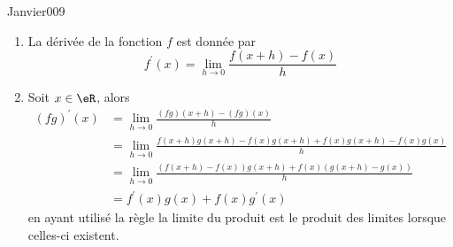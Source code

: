 \begin{corrige}{Janvier009}


\begin{enumerate}
\item
La dérivée de la fonction $f$ est donnée par
  \begin{equation*}
    f^\prime(x) = \lim_{h\to 0} \frac{f(x+h) - f(x)}{h}
  \end{equation*}
\item Soit $x \in \eR$, alors
  \begin{equation*}
    \begin{split}
      (fg)^\prime(x) &= \lim_{h\to 0} \frac{(fg)(x+h) -
        (fg)(x)}{h}\\
      &= \lim_{h\to 0} \frac{f(x+h)g(x+h) - f(x) g(x+h) + f(x)
        g(x+h)
        - f(x)g(x)}{h}\\
      &= \lim_{h\to 0} \frac{(f(x+h) - f(x)) g(x+h) + f(x) (g(x+h)
        - g(x))}{h}\\
      &= f^\prime(x)g(x) + f(x) g^\prime(x)
    \end{split}
  \end{equation*}
en ayant utilisé la règle \og la limite du produit est le produit des limites lorsque celles-ci existent\fg.
\end{enumerate}

\end{corrige}
